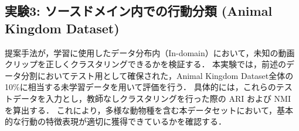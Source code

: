 \subsection{実験3: ソースドメイン内での行動分類 (Animal Kingdom Dataset)}
提案手法が，学習に使用したデータ分布内（In-domain）において，未知の動画クリップを正しくクラスタリングできるかを検証する．
本実験では，前述のデータ分割においてテスト用として確保された，Animal Kingdom Dataset全体の10\%に相当する未学習データを用いて評価を行う．
具体的には，これらのテストデータを入力とし，教師なしクラスタリングを行った際の ARI および NMI を算出する．
これにより，多様な動物種を含む本データセットにおいて，基本的な行動の特徴表現が適切に獲得できているかを確認する．